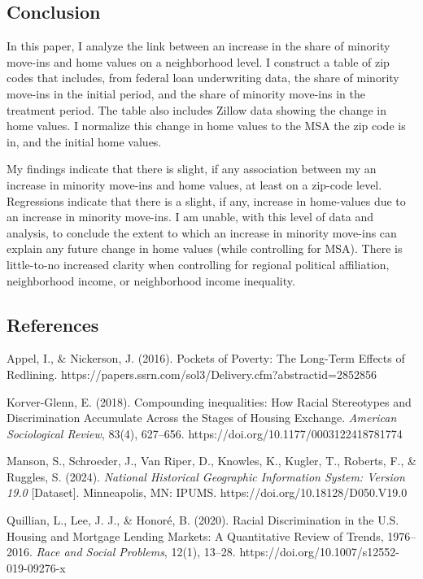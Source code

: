 \documentclass[11pt]{article}
\begin{document}
    \subsection{Conclusion}\label{conclusion}

    In this paper, I analyze the link between an increase in the share of
minority move-ins and home values on a neighborhood level. I construct a
table of zip codes that includes, from federal loan underwriting data,
the share of minority move-ins in the initial period, and the share of
minority move-ins in the treatment period. The table also includes
Zillow data showing the change in home values. I normalize this change
in home values to the MSA the zip code is in, and the initial home
values.

My findings indicate that there is slight, if any association between my
an increase in minority move-ins and home values, at least on a zip-code
level. Regressions indicate that there is a slight, if any, increase in
home-values due to an increase in minority move-ins. I am unable, with
this level of data and analysis, to conclude the extent to which an
increase in minority move-ins can explain any future change in home
values (while controlling for MSA). There is little-to-no increased
clarity when controlling for regional political affiliation,
neighborhood income, or neighborhood income inequality.

    \subsection{References}\label{references}

    Appel, I., \& Nickerson, J. (2016). Pockets of Poverty: The Long-Term
Effects of Redlining.
https://papers.ssrn.com/sol3/Delivery.cfm?abstractid=2852856

Korver-Glenn, E. (2018). Compounding inequalities: How Racial
Stereotypes and Discrimination Accumulate Across the Stages of Housing
Exchange. \emph{American Sociological Review}, 83(4), 627--656.
https://doi.org/10.1177/0003122418781774

Manson, S., Schroeder, J., Van Riper, D., Knowles, K., Kugler, T.,
Roberts, F., \& Ruggles, S. (2024). \emph{National Historical Geographic
Information System: Version 19.0} {[}Dataset{]}. Minneapolis, MN: IPUMS.
https://doi.org/10.18128/D050.V19.0

Quillian, L., Lee, J. J., \& Honoré, B. (2020). Racial Discrimination in
the U.S. Housing and Mortgage Lending Markets: A Quantitative Review of
Trends, 1976--2016. \emph{Race and Social Problems}, 12(1), 13--28.
https://doi.org/10.1007/s12552-019-09276-x
\end{document}
